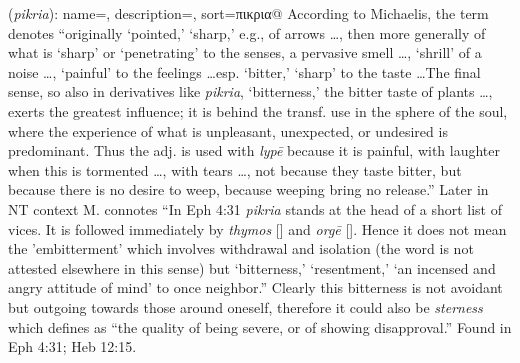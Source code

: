 \item[Bitterness,]

(\textit{pikria}):
{
    name=,
    description={},
    sort=πικρια@
}
According to Michaelis, the term denotes ``originally `pointed,' `sharp,' e.g., of arrows \ldots, then more generally of what is `sharp' or `penetrating' to the senses, a pervasive smell \ldots, `shrill' of a noise \ldots, `painful' to the feelings \ldots esp. `bitter,' `sharp' to the taste \ldots The final sense, so also in derivatives like \emph{pikria}, `bitterness,' the bitter taste of plants \ldots, exerts the greatest influence; it is behind the transf. use in the sphere of the soul, where the experience of what is unpleasant, unexpected, or undesired is predominant. Thus the adj. is used with \emph{lypē} because it is painful, with laughter when this is tormented \ldots, with tears \ldots, not because they taste bitter, but because there is no desire to weep, because weeping bring no release.''
Later in NT context M. connotes ``In Eph 4:31 \emph{pikria} stands at the head of a short list of vices. It is followed immediately by \emph{thymos} [] and \emph{orgē} []. Hence it does not mean the 'embitterment' which involves withdrawal and isolation (the word is not attested elsewhere in this sense) but `bitterness,' `resentment,' `an incensed and angry attitude of mind' to once neighbor.''
Clearly this bitterness is not avoidant but outgoing towards those around oneself, therefore it could also be \emph{sterness} which defines as ``the quality of being severe, or of showing disapproval.''
Found in Eph 4:31; Heb 12:15.

